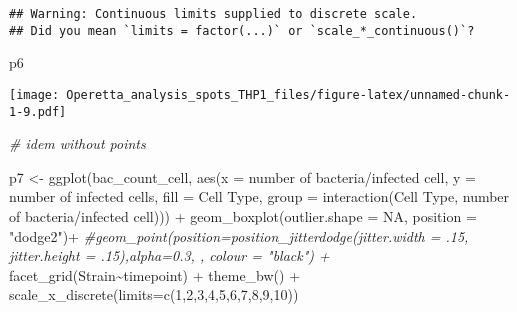 \documentclass[
]{article}
\newenvironment{Shaded}{\begin{snugshade}}{\end{snugshade}}
\newcommand{\AttributeTok}[1]{\textcolor[rgb]{0.77,0.63,0.00}{#1}}
\newcommand{\CommentTok}[1]{\textcolor[rgb]{0.56,0.35,0.01}{\textit{#1}}}
\newcommand{\ConstantTok}[1]{\textcolor[rgb]{0.00,0.00,0.00}{#1}}
\newcommand{\DecValTok}[1]{\textcolor[rgb]{0.00,0.00,0.81}{#1}}
\newcommand{\FunctionTok}[1]{\textcolor[rgb]{0.00,0.00,0.00}{#1}}
\newcommand{\NormalTok}[1]{#1}
\newcommand{\OtherTok}[1]{\textcolor[rgb]{0.56,0.35,0.01}{#1}}
\newcommand{\SpecialCharTok}[1]{\textcolor[rgb]{0.00,0.00,0.00}{#1}}
\newcommand{\StringTok}[1]{\textcolor[rgb]{0.31,0.60,0.02}{#1}}
\begin{document}
\begin{verbatim}
## Warning: Continuous limits supplied to discrete scale.
## Did you mean `limits = factor(...)` or `scale_*_continuous()`?
\end{verbatim}

\begin{Shaded}
\begin{Highlighting}[]
\NormalTok{p6}
\end{Highlighting}
\end{Shaded}

\texttt{[image: Operetta\_analysis\_spots\_THP1\_files/figure-latex/unnamed-chunk-1-9.pdf]}

\begin{Shaded}
\begin{Highlighting}[]
\CommentTok{\# idem without points}


\NormalTok{p7 }\OtherTok{\textless{}{-}} \FunctionTok{ggplot}\NormalTok{(bac\_count\_cell, }\FunctionTok{aes}\NormalTok{(}\AttributeTok{x =} \StringTok{\textasciigrave{}}\AttributeTok{number of bacteria/infected cell}\StringTok{\textasciigrave{}}\NormalTok{, }\AttributeTok{y =} \StringTok{\textasciigrave{}}\AttributeTok{number of infected cells}\StringTok{\textasciigrave{}}\NormalTok{, }\AttributeTok{fill =} \StringTok{\textasciigrave{}}\AttributeTok{Cell Type}\StringTok{\textasciigrave{}}\NormalTok{,}
                                 \AttributeTok{group =}  \FunctionTok{interaction}\NormalTok{(}\StringTok{\textasciigrave{}}\AttributeTok{Cell Type}\StringTok{\textasciigrave{}}\NormalTok{, }\StringTok{\textasciigrave{}}\AttributeTok{number of bacteria/infected cell}\StringTok{\textasciigrave{}}\NormalTok{))) }\SpecialCharTok{+}
  \FunctionTok{geom\_boxplot}\NormalTok{(}\AttributeTok{outlier.shape =} \ConstantTok{NA}\NormalTok{, }\AttributeTok{position =} \StringTok{"dodge2"}\NormalTok{)}\SpecialCharTok{+}
  \CommentTok{\#geom\_point(position=position\_jitterdodge(jitter.width = .15, jitter.height = .15),alpha=0.3, , colour = "black") +}
  \FunctionTok{facet\_grid}\NormalTok{(Strain}\SpecialCharTok{\textasciitilde{}}\NormalTok{timepoint) }\SpecialCharTok{+}
  \FunctionTok{theme\_bw}\NormalTok{() }\SpecialCharTok{+}
  \FunctionTok{scale\_x\_discrete}\NormalTok{(}\AttributeTok{limits=}\FunctionTok{c}\NormalTok{(}\DecValTok{1}\NormalTok{,}\DecValTok{2}\NormalTok{,}\DecValTok{3}\NormalTok{,}\DecValTok{4}\NormalTok{,}\DecValTok{5}\NormalTok{,}\DecValTok{6}\NormalTok{,}\DecValTok{7}\NormalTok{,}\DecValTok{8}\NormalTok{,}\DecValTok{9}\NormalTok{,}\DecValTok{10}\NormalTok{))}
\end{Highlighting}
\end{Shaded}
\end{document}
